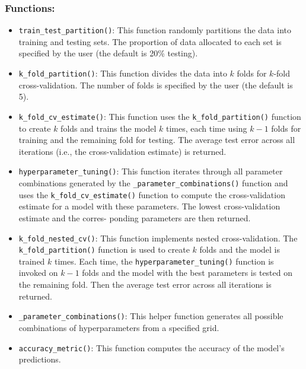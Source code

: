 \documentclass{article}
\begin{document}
\subsubsection*{Functions:}

\begin{itemize}
    \item \texttt{train\_test\_partition()}: 
    This function randomly partitions the data into training and testing sets. The proportion of data allocated to each set is specified by the user (the default is 20\% testing).
    
    \item \texttt{k\_fold\_partition()}:  
    This function divides the data into \( k \) folds for \( k \)-fold cross-validation. The number of folds is specified by the user (the default is 5).
    
    \item \texttt{k\_fold\_cv\_estimate()}:  
    This function uses the \texttt{k\_fold\_partition()} function to create \( k \) folds and trains the model \( k \) times, each time using \( k-1 \) folds for training and the remaining fold for testing. The average test error across all iterations (i.e., the cross-validation estimate) is returned.
    
    \item \texttt{hyperparameter\_tuning()}: 
        This function iterates through all parameter combinations generated by the \texttt{\_parameter\_combinations()} function and uses the \texttt{k\_fold\_cv\_estimate()} function to compute the cross-validation estimate for a model with these parameters. The lowest cross-validation estimate and the corres- ponding parameters are then returned.
        
    \item \texttt{k\_fold\_nested\_cv()}: 
    This function implements nested cross-validation. The \texttt{k\_fold\_partition()} function is used to create \( k \) folds and the model is trained \( k \) times. Each time, the \texttt{hyperparameter\_tuning()} function is invoked on \( k-1 \) folds and the model with the best parameters is tested on the remaining fold. Then the average test error across all iterations is returned.

    \item \texttt{\_parameter\_combinations()}: 
    This helper function generates all possible combinations of hyperparameters from a specified grid.

    \item \texttt{accuracy\_metric()}: 
    This function computes the accuracy of the model’s predictions.
\end{itemize}
\end{document}
